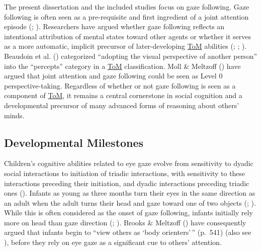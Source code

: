 \documentclass[
]{scrbook}
\begin{document}
The present dissertation and the included studies focus on gaze following. Gaze following is often seen as a pre-requisite and first ingredient of a joint attention episode (; ). Researchers have argued whether gaze following reflects an intentional attribution of mental states toward other agents or whether it serves as a more automatic, implicit precursor of later-developing \hyperref[acronyms_ToM]{ToM} abilities (; ; ). Beaudoin et al. () categorized ``adopting the visual perspective of another person'' into the ``percepts'' category in a \hyperref[acronyms_ToM]{ToM} classification. Moll \& Meltzoff () have argued that joint attention and gaze following could be seen as Level 0 perspective-taking. Regardless of whether or not gaze following is seen as a component of \hyperref[acronyms_ToM]{ToM}, it remains a central cornerstone in social cognition and a developmental precursor of many advanced forms of reasoning about others' minds.

\subsection{Developmental Milestones}\label{developmental-milestones-1}

Children's cognitive abilities related to eye gaze evolve from sensitivity to dyadic social interactions to initiation of triadic interactions, with sensitivity to these interactions preceding their initiation, and dyadic interactions preceding triadic ones (). Infants as young as three months turn their eyes in the same direction as an adult when the adult turns their head and gaze toward one of two objects (; ). While this is often considered as the onset of gaze following, infants initially rely more on head than gaze direction (; ). Brooks \& Meltzoff () have consequently argued that infants begin to ``view others as `body orienters'\,'' (p.~541) (also see ), before they rely on eye gaze as a significant cue to others' attention.
\end{document}
